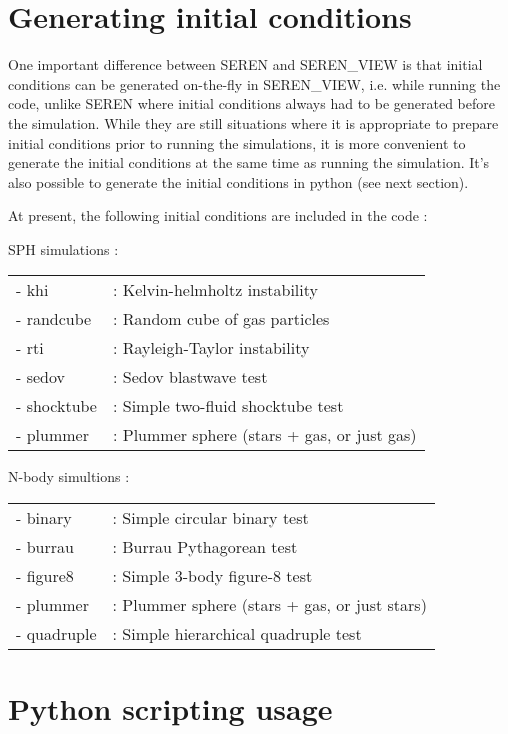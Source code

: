 \documentclass[a4paper]{article}
\begin{document}
\section{Generating initial conditions}

One important difference between SEREN and SEREN\_VIEW is that initial conditions can be generated on-the-fly in SEREN\_VIEW, i.e. while running the code, unlike SEREN where initial conditions always had to be generated before the simulation.  While they are still situations where it is appropriate to prepare initial conditions prior to running the simulations, it is more convenient to generate the initial conditions at the same time as running the simulation. It's also possible to generate the initial conditions in python (see next section).

At present, the following initial conditions are included in the code : 

\noindent SPH simulations : \\
\begin{tabular}{ll}
- khi       &: Kelvin-helmholtz instability \\
- randcube  &: Random cube of gas particles \\
- rti       &: Rayleigh-Taylor instability \\
- sedov     &: Sedov blastwave test \\
- shocktube &: Simple two-fluid shocktube test \\
- plummer   &: Plummer sphere (stars + gas, or just gas)
\end{tabular}
\newline

\noindent N-body simultions : \\
\begin{tabular}{ll}
- binary    &: Simple circular binary test \\
- burrau    &: Burrau Pythagorean test \\
- figure8   &: Simple 3-body figure-8 test \\
- plummer   &: Plummer sphere (stars + gas, or just stars) \\
- quadruple &: Simple hierarchical quadruple test
\end{tabular}


\section{Python scripting usage}
\end{document}
